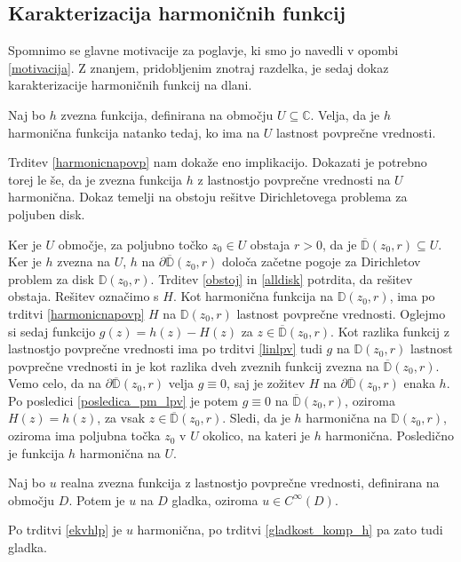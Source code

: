 \documentclass[mat1, tisk]{fmfdelo}
\begin{document}
\subsection{Karakterizacija harmoničnih funkcij}
    Spomnimo se glavne motivacije za poglavje, ki smo jo navedli v opombi \ref{motivacija}.
    Z znanjem, pridobljenim znotraj razdelka, je sedaj dokaz karakterizacije harmoničnih funkcij na dlani.
    
    \begin{trditev}
        \label{ekvhlp}
        Naj bo $h$ zvezna funkcija, definirana na območju $U \subseteq \mathbb{C}$. Velja, da je $h$ harmonična funkcija natanko tedaj, ko ima na $U$ lastnost povprečne vrednosti.
    \end{trditev}
    \begin{dokaz}
        Trditev \ref{harmonicnapovp} nam dokaže eno implikacijo. Dokazati je potrebno torej le še, da je zvezna funkcija $h$ z lastnostjo povprečne vrednosti na $U$ harmonična. 
        Dokaz temelji na obstoju rešitve Dirichletovega problema za poljuben disk. 
        
        Ker je $U$ območje, za poljubno točko $z_0 \in U$ obstaja $r>0$, da je $\overline{\mathbb{D}}(z_0,r) \subseteq U$. Ker je $h$ zvezna na $U$, $h$ na $\partial \overline{\mathbb{D}}(z_0, r)$ določa začetne pogoje za Dirichletov problem za disk $\mathbb{D}(z_0,r)$.
        Trditev \ref{obstoj} in \ref{alldisk} potrdita, da rešitev obstaja. Rešitev označimo s $H$.
        Kot harmonična funkcija na $\mathbb{D}(z_0, r)$, ima po trditvi \ref{harmonicnapovp} $H$ na $\mathbb{D}(z_0, r)$ lastnost povprečne vrednosti. 
        Oglejmo si sedaj funkcijo $g(z) = h(z) - H(z)$ za $z \in \overline{\mathbb{D}}(z_0,r)$. 
        Kot razlika funkcij z lastnostjo povprečne vrednosti ima po trditvi \ref{linlpv} tudi $g$ na $\mathbb{D}(z_0, r)$ lastnost povprečne vrednosti in je kot razlika dveh zveznih funkcij zvezna na $\overline{\mathbb{D}}(z_0, r)$.
        Vemo celo, da na $\partial \overline{\mathbb{D}}(z_0, r)$ velja $g \equiv 0$, saj je zožitev $H$ na $\partial \overline{\mathbb{D}}(z_0,r)$ enaka $h$. 
        Po posledici \ref{posledica_pm_lpv} je potem $g \equiv 0$ na $\overline{\mathbb{D}}(z_0, r)$, oziroma $H(z) =  h(z)$, za vsak $z \in \overline{\mathbb{D}}(z_0, r)$. Sledi, da je $h$ harmonična na $\mathbb{D}(z_0, r)$, oziroma ima poljubna točka $z_0$ v $U$ okolico, na kateri je $h$ harmonična. 
        Posledično je funkcija $h$ harmonična na $U$.
    \end{dokaz}
    \begin{posledica}
        Naj bo $u$ realna zvezna funkcija z lastnostjo povprečne vrednosti, definirana na območju $D$. Potem je $u$ na $D$ gladka, oziroma $u \in C^{\infty}(D)$.
    \end{posledica}
    \begin{dokaz}
        Po trditvi \ref{ekvhlp} je $u$ harmonična, po trditvi \ref{gladkost_komp_h} pa zato tudi gladka.
    \end{dokaz}
\end{document}

